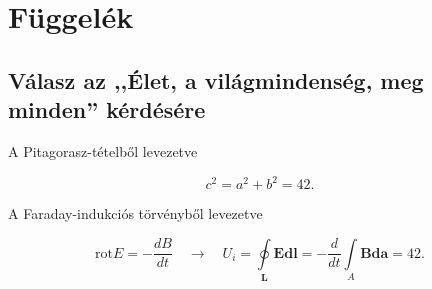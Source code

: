 \appendix

\chapter{Függelék}\label{fuxfcggeluxe9k}

\section{Válasz az ,,Élet, a világmindenség, meg minden''
kérdésére}\label{vuxe1lasz-az-uxe9let-a-viluxe1gmindensuxe9g-meg-minden-kuxe9rduxe9suxe9re}

A Pitagorasz-tételből levezetve

\[c^2=a^2+b^2=42.\]

A Faraday-indukciós törvényből levezetve

\[\mathrm{rot} E=-\frac{dB}{dt} \quad \longrightarrow \quad U_i=\oint\limits_\mathbf{L}{\mathbf{E}\mathbf{dl}}=-\frac{d}{dt}\int\limits_A{\mathbf{B}\mathbf{da}}=42.\]

